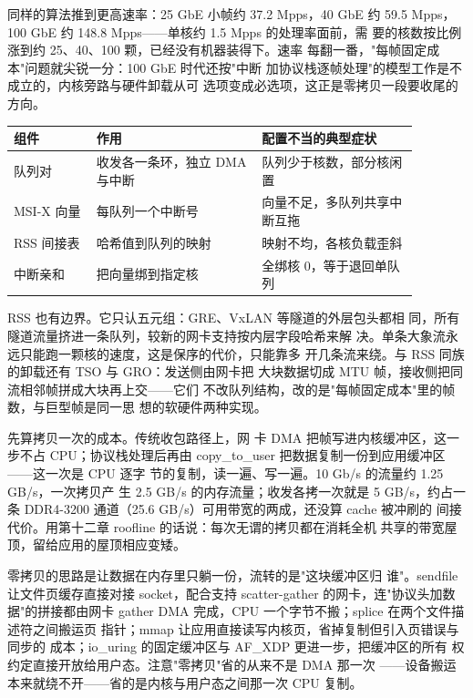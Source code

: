 同样的算法推到更高速率：25 GbE 小帧约 37.2 Mpps，40 GbE 约 59.5
Mpps，100 GbE 约 148.8 Mpps——单核约 1.5 Mpps 的处理率面前，需
要的核数按比例涨到约 25、40、100 颗，已经没有机器装得下。速率
每翻一番，"每帧固定成本"问题就尖锐一分：100 GbE 时代还按"中断
加协议栈逐帧处理"的模型工作是不成立的，内核旁路与硬件卸载从可
选项变成必选项，这正是零拷贝一段要收尾的方向。

\begin{longtable}{L{0.18\linewidth}L{0.36\linewidth}L{0.34\linewidth}}
\toprule
组件 & 作用 & 配置不当的典型症状 \\
\midrule
队列对 & 收发各一条环，独立 DMA 与中断 & 队列少于核数，部分核闲置 \\
MSI-X 向量 & 每队列一个中断号 & 向量不足，多队列共享中断互拖 \\
RSS 间接表 & 哈希值到队列的映射 & 映射不均，各核负载歪斜 \\
中断亲和 & 把向量绑到指定核 & 全绑核 0，等于退回单队列 \\
\bottomrule
\end{longtable}

RSS 也有边界。它只认五元组：GRE、VxLAN 等隧道的外层包头都相
同，所有隧道流量挤进一条队列，较新的网卡支持按内层字段哈希来解
决。单条大象流永远只能跑一颗核的速度，这是保序的代价，只能靠多
开几条流来绕。与 RSS 同族的卸载还有 TSO 与 GRO：发送侧由网卡把
大块数据切成 MTU 帧，接收侧把同流相邻帧拼成大块再上交——它们
不改队列结构，改的是"每帧固定成本"里的帧数，与巨型帧是同一思
想的软硬件两种实现。

先算拷贝一次的成本。传统收包路径上，网
卡 DMA 把帧写进内核缓冲区，这一步不占 CPU；协议栈处理后再由
copy\_to\_user 把数据复制一份到应用缓冲区——这一次是 CPU 逐字
节的复制，读一遍、写一遍。10 Gb/s 的流量约 1.25 GB/s，一次拷贝产
生 2.5 GB/s 的内存流量；收发各拷一次就是 5 GB/s，约占一条
DDR4-3200 通道（25.6 GB/s）可用带宽的两成，还没算 cache 被冲刷的
间接代价。用第十二章 roofline 的话说：每次无谓的拷贝都在消耗全机
共享的带宽屋顶，留给应用的屋顶相应变矮。

零拷贝的思路是让数据在内存里只躺一份，流转的是"这块缓冲区归
谁"。sendfile 让文件页缓存直接对接 socket，配合支持
scatter-gather 的网卡，连"协议头加数据"的拼接都由网卡 gather
DMA 完成，CPU 一个字节不搬；splice 在两个文件描述符之间搬运页
指针；mmap 让应用直接读写内核页，省掉复制但引入页错误与同步的
成本；io\_uring 的固定缓冲区与 AF\_XDP 更进一步，把缓冲区的所有
权约定直接开放给用户态。注意"零拷贝"省的从来不是 DMA 那一次
——设备搬运本来就绕不开——省的是内核与用户态之间那一次 CPU
复制。

